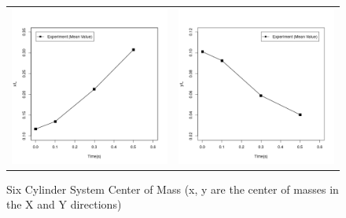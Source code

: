 \begin{figure}[htb!]
\centering
\setlength\fboxsep{0pt}
       \begin{tabular}{cc}
 	   \includegraphics[scale=0.325]{figures/XexpDataR.png} &\includegraphics[scale=0.325]{figures/YexpDataR.png}
 	   \end{tabular}      
\caption{{\small{Six Cylinder System Center of Mass (x, y are the center of masses in the X and Y directions)}}}
\label{fig:sys_cm}
\end{figure}

